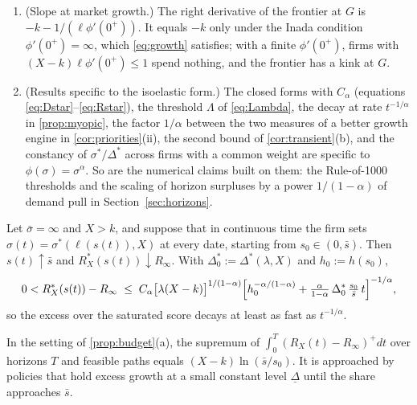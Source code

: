 \begin{remark}
\begin{enumerate}
\item[(c)] (Slope at market growth.) The right derivative of the frontier at $G$ is $-k-1/(\ell\phi'(0^+))$. It equals $-k$ only under the Inada condition $\phi'(0^+)=\infty$, which \eqref{eq:growth} satisfies; with a finite $\phi'(0^+)$, firms with $(X-k)\ell\phi'(0^+)\le1$ spend nothing, and the frontier has a kink at $G$.
\item[(d)] (Results specific to the isoelastic form.) The closed forms with $C_\alpha$ (equations \eqref{eq:Dstar}--\eqref{eq:Rstar}), the threshold $\Lambda$ of \eqref{eq:Lambda}, the decay at rate $t^{-1/\alpha}$ in \autoref{prop:myopic}, the factor $1/\alpha$ between the two measures of a better growth engine in \autoref{cor:priorities}(ii), the second bound of \autoref{cor:transient}(b), and the constancy of $\sigma^*/\Delta^*$ across firms with a common weight are specific to $\phi(\sigma)=\sigma^\alpha$. So are the numerical claims built on them: the Rule-of-1000 thresholds and the scaling of horizon surpluses by a power $1/(1-\alpha)$ of demand pull in Section~\ref{sec:horizons}.
\end{enumerate}
\end{remark}

\begin{proposition}\label{prop:myopic}
Let $\bar\sigma=\infty$ and $X>k$, and suppose that in continuous time the firm sets $\sigma(t)=\sigma^*(\ell(s(t)),X)$ at every date, starting from $s_0\in(0,\bar s)$. Then $s(t)\uparrow\bar s$ and $R_X^*(s(t))\downarrow R_\infty$. With $\Delta_0^*:=\Delta^*(\lambda,X)$ and $h_0:=h(s_0)$,
\begin{equation}\label{eq:myopic}
0<R_X^*(s(t))-R_\infty\;\le\;C_\alpha\bigl[\lambda(X-k)\bigr]^{1/(1-\alpha)}\Bigl[h_0^{-\alpha/(1-\alpha)}+\tfrac{\alpha}{1-\alpha}\,\Delta_0^*\,\tfrac{s_0}{\bar s}\,t\Bigr]^{-1/\alpha},
\end{equation}
so the excess over the saturated score decays at least as fast as $t^{-1/\alpha}$.
\end{proposition}

\begin{proposition}\label{prop:budget-sharp}
In the setting of \autoref{prop:budget}(a), the supremum of $\int_0^T(R_X(t)-R_\infty)^+dt$ over horizons $T$ and feasible paths equals $(X-k)\ln(\bar s/s_0)$. It is approached by policies that hold excess growth at a small constant level $\underline\Delta$ until the share approaches $\bar s$.
\end{proposition}

